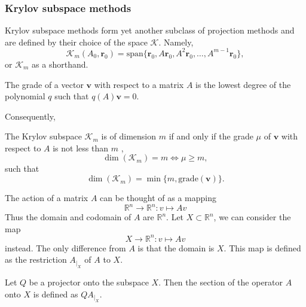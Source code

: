 \subsubsection{Krylov subspace methods}
Krylov subspace methods form yet another subclass of projection methods and are defined by their choice of the space $\mathcal{K}$. Namely,
\begin{equation}
  \mathcal{K}_m(A_0, \mathbf{r}_0) = \text{span}\{\mathbf{r}_0, A\mathbf{r}_0, A^2\mathbf{r}_0, \dots, A^{m-1}\mathbf{r}_0\},
  \label{eq:cg_krylov_space}
\end{equation}
or $\mathcal{K}_m$ as a shorthand.
\begin{definition}
  The grade of a vector $\mathbf{v}$ with respect to a matrix $A$ is the lowest degree of the polynomial $q$ such that $q(A)\mathbf{v} = 0$.
  \label{def:cg_grade}
\end{definition}
Consequently,
\begin{theorem}
  The Krylov subspace $\mathcal{K}_m$ is of dimension $m$ if and only if the grade $\mu$ of $\mathbf{v}$ with respect to $A$ is not less than $m$ \cite[proposition 6.2]{iter_method_saad},
  \begin{equation*}
    \dim(\mathcal{K}_m) = m \iff \mu \geq m,
  \end{equation*}
  such that
  \begin{equation}
    \dim(\mathcal{K}_m) = \min \{m, \textrm{grade}(\mathbf{v})\}.
    \label{eq:cg_krylov_dimension}
  \end{equation}
  \label{th:cg_krylov_dimension}
\end{theorem}

\begin{definition}
  The action of a matrix $A$ can be thought of as a mapping
  \begin{equation*}
    \mathbb{R}^n \rightarrow \mathbb{R}^n: v \mapsto A v
  \end{equation*}
  Thus the domain and codomain of $A$ are $\mathbb{R}^n$. Let $X \subset \mathbb{R}^n$, we can consider the map
  \begin{equation*}
    X \rightarrow \mathbb{R}^n: v \mapsto A v
  \end{equation*}
  instead. The only difference from $A$ is that the domain is $X$. This map is defined as the restriction $A_{\left.\right|_X}$ of $A$ to $X$.
\end{definition}

\begin{definition}
  Let $Q$ be a projector onto the subspace $X$. Then the section of the operator $A$ onto $X$ is defined as $QA_{\left.\right|_X}$.
\end{definition}


